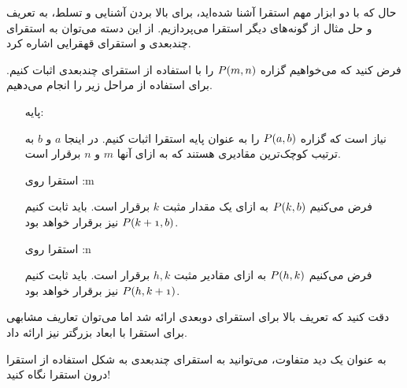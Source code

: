 حال که با دو ابزار مهم استقرا آشنا شده‌اید،
برای بالا بردن آشنایی و تسلط،‌ به تعریف و حل مثال از گونه‌های دیگر استقرا می‌پردازیم.
از این دسته می‌توان به استقرای چندبعدی و استقرای قهقرایی اشاره کرد.


\begin{DEFINITION}
    فرض کنید که می‌خواهیم  گزاره
    $\mathnormal{P(m, n)}$
    را با استفاده از استقرای چندبعدی اثبات کنیم.
    برای استفاده از
    مراحل زیر را انجام می‌دهیم.
    
    \begin{enumerate}
        \item [پایه:]
                
                نیاز است که گزاره 
                $\mathnormal{P(a, b)}$
                را به عنوان پایه استقرا اثبات کنیم.
                در اینجا
                $a$
                و
                $b$
                به ترتیب کوچک‌ترین مقادیری هستند که به ازای آنها
                $m$
                و
                $n$
                برقرار است.

        \item[استقرا روی :m]
        
                فرض می‌کنیم
                $\mathnormal{P(k, b)}$
                به ازای یک مقدار مثبت
                $k$
                برقرار است. باید ثابت کنیم
                $\mathnormal{P(k + 1, b)}$
                نیز برقرار خواهد بود.
        
        \item[استقرا روی :n]
                
                فرض می‌کنیم
                $\mathnormal{P(h, k)}$
                به ازای مقادیر مثبت
                $h, k$
                برقرار است. باید ثابت کنیم
                $\mathnormal{P(h, k + 1)}$
                نیز برقرار خواهد بود.


    \end{enumerate} 
    دقت کنید که تعریف بالا برای استقرای دوبعدی ارائه شد اما می‌توان تعاریف مشابهی برای استقرا با ابعاد
    بزرگتر نیز ارائه داد.
    
    به عنوان یک دید متفاوت، می‌توانید به استقرای چندبعدی به شکل استفاده از استقرا درون استقرا نگاه کنید!
\end{DEFINITION}

